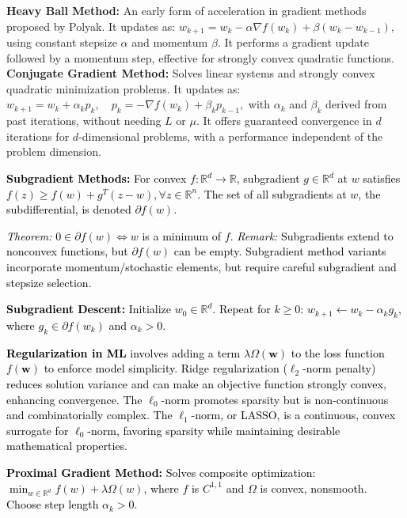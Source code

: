 \documentclass[a4paper,6pt]{extarticle}
\newcommand{\mybox}[2]{
    \begin{tcolorbox}[colback=color!5!white, colframe=color!75!black, boxsep=2pt, top=1pt, bottom=1pt, left=2pt, right=2pt, arc=3pt, outer arc=3pt, title={\textbf{#1}}]
    {\fontsize{5pt}{5pt}\selectfont \textcolor{black}{#2}}
    \end{tcolorbox}
}
\begin{document}
\begin{multicols}{2}
{            \textbf{Heavy Ball Method:}
            An early form of acceleration in gradient methods proposed by Polyak. It updates as:
            $ w_{k+1} = w_k - \alpha \nabla f(w_k) + \beta (w_k - w_{k-1}), $
            using constant stepsize $\alpha$ and momentum $\beta$. It performs a gradient update followed by a momentum step, effective for strongly convex quadratic functions. \textbf{Conjugate Gradient Method:}
            Solves linear systems and strongly convex quadratic minimization problems. It updates as:
            $ w_{k+1} = w_k + \alpha_k p_k, \quad p_k = -\nabla f(w_k) + \beta_k p_{k-1}, $
            with $\alpha_k$ and $\beta_k$ derived from past iterations, without needing $L$ or $\mu$. It offers guaranteed convergence in $d$ iterations for $d$-dimensional problems, with a performance independent of the problem dimension.
        }

        \mybox{Regularization + Non-smooth function}{

            \textbf{Subgradient Methods:}
            For convex $f: \mathbb{R}^d \rightarrow \mathbb{R}$, subgradient $g \in \mathbb{R}^d$ at $w$ satisfies $f(z) \geq f(w) + g^T(z - w), \forall z \in \mathbb{R}^n$. The set of all subgradients at $w$, the subdifferential, is denoted $\partial f(w)$.

            \textit{Theorem:} $0 \in \partial f(w) \iff w$ is a minimum of $f$. \textit{Remark:} Subgradients extend to nonconvex functions, but $\partial f(w)$ can be empty.
            Subgradient method variants incorporate momentum/stochastic elements, but require careful subgradient and stepsize selection.

            \textbf{Subgradient Descent:} Initialize $w_0 \in \mathbb{R}^d$. Repeat for $k \geq 0$: $w_{k+1} \leftarrow w_k - \alpha_k g_k$, where $g_k \in \partial f(w_k)$ and $\alpha_k > 0$.

            \textbf{Regularization in ML} involves adding a term \(\lambda\Omega(\boldsymbol{w})\) to the loss function \(f(\boldsymbol{w})\) to enforce model simplicity. Ridge regularization (\(\ell_2\)-norm penalty) reduces solution variance and can make an objective function strongly convex, enhancing convergence. The \(\ell_0\)-norm promotes sparsity but is non-continuous and combinatorially complex. The \(\ell_1\)-norm, or LASSO, is a continuous, convex surrogate for \(\ell_0\)-norm, favoring sparsity while maintaining desirable mathematical properties.


            \textbf{Proximal Gradient Method:}
            Solves composite optimization: $\min_{w \in \mathbb{R}^d} f(w) + \lambda \Omega(w)$, where $f$ is $C^{1,1}$ and $\Omega$ is convex, nonsmooth. Choose step length $\alpha_k > 0$.

}
\end{multicols}
\end{document}
